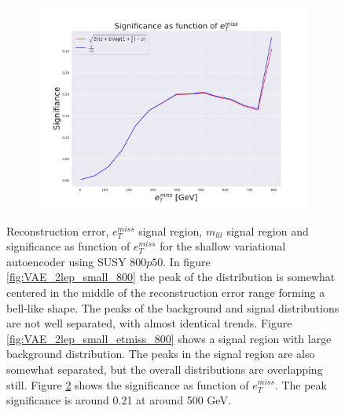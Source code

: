 \begin{figure}[H]
    \hfill  
    \begin{subfigure}{.50\textwidth}
        \includegraphics[width=\textwidth]{Figures/VAE_testing/small/2lep/significance_etmiss_800p0p050_-0.8542149600758421.pdf}
        \caption{}
        \label{ffig:VAE_2lep_small_signi_800}
    \end{subfigure}
    \hfill      
    \caption[2lep shallow network | $800p50$ | VAE]{Reconstruction error, $e_T^{miss}$ signal region, $m_{lll}$ signal region and significance as function of 
    $e_T^{miss}$ for the shallow variational autoencoder using SUSY $800p50$. In figure
    \ref{fig:VAE_2lep_small_800} the peak of the distribution is somewhat centered in the middle 
    of the reconstruction error range forming a bell-like shape. The peaks of the background and signal 
    distributions are not well separated, with almost identical trends. Figure \ref{fig:VAE_2lep_small_etmiss_800}
    shows a signal region with large background distribution. The peaks in the signal region are also somewhat 
    separated, but the overall distributions are overlapping still. 
    Figure  \ref{fig:VAE_2lep_small_rec_sig_signi_800}
    shows the significance as function of $e_T^{miss}$. 
    The peak significance is around 0.21 at around 500 GeV. }
    \label{fig:VAE_2lep_small_rec_sig_signi_800}
\end{figure}


